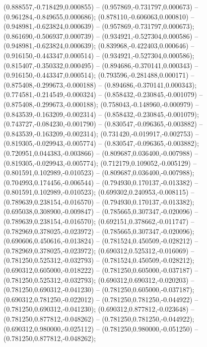  (0.888557,-0.718429,0.000855) -- (0.957869,-0.731797,0.000673) -- (0.961284,-0.849655,0.000686);
 (0.878110,-0.606063,0.000810) -- (0.948981,-0.623824,0.000639) -- (0.957869,-0.731797,0.000673);
 (0.861690,-0.506937,0.000739) -- (0.934921,-0.527304,0.000586) -- (0.948981,-0.623824,0.000639);
 (0.839968,-0.422403,0.000646) -- (0.916150,-0.443347,0.000514) -- (0.934921,-0.527304,0.000586);
 (0.815407,-0.350332,0.000495) -- (0.894686,-0.370141,0.000343) -- (0.916150,-0.443347,0.000514);
 (0.793596,-0.281488,0.000171) -- (0.875408,-0.299673,-0.000188) -- (0.894686,-0.370141,0.000343);
 (0.774581,-0.214549,-0.000324) -- (0.858432,-0.230845,-0.001079) -- (0.875408,-0.299673,-0.000188);
 (0.758043,-0.148960,-0.000979) -- (0.843539,-0.163209,-0.002314) -- (0.858432,-0.230845,-0.001079);
 (0.743727,-0.084230,-0.001790) -- (0.830547,-0.096365,-0.003882) -- (0.843539,-0.163209,-0.002314);
 (0.731420,-0.019917,-0.002753) -- (0.819305,-0.029943,-0.005774) -- (0.830547,-0.096365,-0.003882);
 (0.720951,0.044383,-0.003866) -- (0.809687,0.036400,-0.007988) -- (0.819305,-0.029943,-0.005774);
 (0.712179,0.109052,-0.005129) -- (0.801591,0.102989,-0.010523) -- (0.809687,0.036400,-0.007988);
 (0.704993,0.174456,-0.006544) -- (0.794930,0.170137,-0.013382) -- (0.801591,0.102989,-0.010523);
 (0.699302,0.240953,-0.008115) -- (0.789639,0.238154,-0.016570) -- (0.794930,0.170137,-0.013382);
 (0.695038,0.308900,-0.009847) -- (0.785665,0.307347,-0.020096) -- (0.789639,0.238154,-0.016570);
 (0.692151,0.378662,-0.011747) -- (0.782969,0.378025,-0.023972) -- (0.785665,0.307347,-0.020096);
 (0.690606,0.450616,-0.013824) -- (0.781524,0.450509,-0.028212) -- (0.782969,0.378025,-0.023972);
 (0.690312,0.525312,-0.016069) -- (0.781250,0.525312,-0.032793) -- (0.781524,0.450509,-0.028212);
 (0.690312,0.605000,-0.018222) -- (0.781250,0.605000,-0.037187) -- (0.781250,0.525312,-0.032793);
 (0.690312,0.690312,-0.020203) -- (0.781250,0.690312,-0.041230) -- (0.781250,0.605000,-0.037187);
 (0.690312,0.781250,-0.022012) -- (0.781250,0.781250,-0.044922) -- (0.781250,0.690312,-0.041230);
 (0.690312,0.877812,-0.023648) -- (0.781250,0.877812,-0.048262) -- (0.781250,0.781250,-0.044922);
 (0.690312,0.980000,-0.025112) -- (0.781250,0.980000,-0.051250) -- (0.781250,0.877812,-0.048262);
